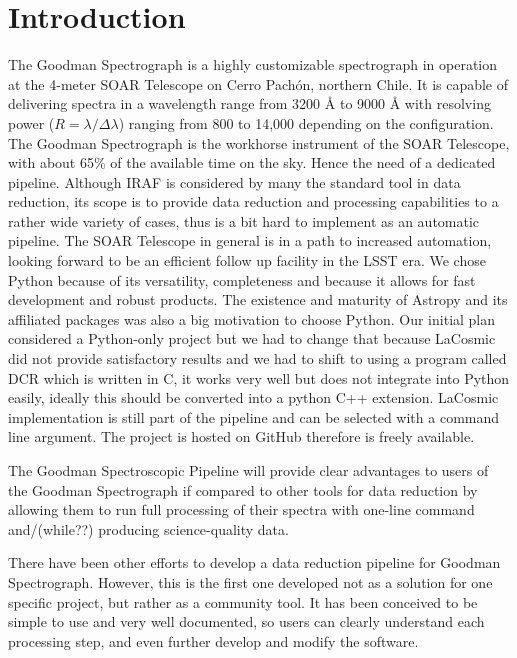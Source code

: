 \documentclass[11pt,twoside]{article}
\begin{document}
\section{Introduction}

The Goodman Spectrograph \citep{2004SPIE.5492..331C} is a highly customizable spectrograph in operation at
the 4-meter SOAR Telescope on Cerro Pach\'on, northern Chile.
It is capable of delivering spectra in a wavelength range from 3200 \AA{} to 9000 \AA{}
with resolving power ($R=\lambda/\Delta\lambda$) ranging from 800 to 14,000
depending on the configuration. The Goodman Spectrograph is the workhorse
instrument of the SOAR Telescope, with about 65\% of the available time on the sky.
Hence the need of a dedicated pipeline. Although IRAF is considered by many the standard tool
in data reduction, its scope is to provide data reduction and processing
capabilities to a rather wide variety of cases, thus is a bit hard to implement
as an automatic pipeline. The SOAR Telescope in general is in a path to increased automation, looking forward to be
an efficient follow up facility in the LSST era. We chose Python because of its
versatility, completeness and because it allows for fast development and
robust products. The existence and maturity of Astropy and its affiliated
packages was also a big motivation to choose Python.
Our initial plan considered a Python-only project but we had to change that
because LaCosmic \citep{2001PASP..113.1420V} did not provide satisfactory results and we had to shift
to using a program called DCR \citep{2004PASP..116..148P} which is written in C,
it works very well but does not integrate into Python easily, ideally this
should be converted into a python C++ extension.
LaCosmic implementation is still part of the pipeline and can be selected with a command
line argument.
The project is hosted on GitHub therefore is freely available.

The Goodman Spectroscopic Pipeline will provide clear advantages to users of the
Goodman Spectrograph if compared to other tools for data reduction by allowing
them to run full processing of their spectra with one-line command and/(while??) producing
science-quality data.

There have been other efforts to develop a data reduction pipeline for Goodman
Spectrograph. However, this is the first one developed not as a solution for one
specific project, but rather as a community tool. It has been conceived to be
simple to use and very well documented, so users can clearly understand each
processing step, and even further develop and modify the software.
\end{document}
